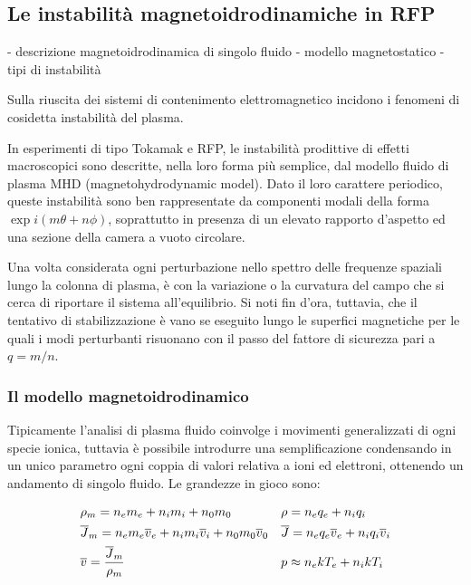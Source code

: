 
\subsection{Le instabilità magnetoidrodinamiche in RFP}
- descrizione magnetoidrodinamica di singolo fluido
- modello magnetostatico
- tipi di instabilità
\newline

Sulla riuscita dei sistemi di contenimento elettromagnetico incidono i
fenomeni di cosidetta instabilità del plasma.

In esperimenti di tipo Tokamak e RFP, le instabilità prodittive di
effetti macroscopici sono descritte, nella loro forma più semplice, dal
modello fluido di plasma MHD (magnetohydrodynamic model). Dato il loro
carattere periodico, queste instabilità sono ben rappresentate da
componenti modali della forma $\exp i(m\theta + n\phi)$, soprattutto in
presenza di un elevato rapporto d'aspetto ed una sezione della camera a
vuoto circolare.

Una volta considerata ogni perturbazione nello spettro delle frequenze spaziali
lungo la colonna di plasma, è con la variazione o la curvatura del campo
che si cerca di riportare il sistema all'equilibrio.
Si noti fin d'ora, tuttavia, che il tentativo di stabilizzazione è vano
se eseguito lungo le superfici magnetiche per le quali i modi
perturbanti risuonano con il passo del fattore di sicurezza pari a
$q=m/n$\cite{wesson}.

\subsubsection{Il modello magnetoidrodinamico}
Tipicamente l'analisi di plasma fluido coinvolge i movimenti
generalizzati di ogni specie ionica, tuttavia è possibile introdurre una
semplificazione condensando in un unico parametro ogni coppia di valori
relativa a ioni ed elettroni, ottenendo un andamento di singolo fluido.
Le grandezze in gioco sono:


\begin{align}
 & \rho_m = n_e m_e + n_i m_i + n_0 m_0 
 && \rho = n_e q_e + n_i q_i
 \\ 
 & \overline{J}_m = n_e m_e \overline{v}_e + n_i m_i \overline{v}_i + n_0 m_0
 \overline{v}_0 
 && \overline{J} = n_e q_e \overline{v}_e + n_i q_i \overline{v}_i
 \\
 & \overline{v} = \frac{\overline{J}_m}{\rho_m} 
 && p \approx n_ekT_e + n_ikT_i
\end{align}

